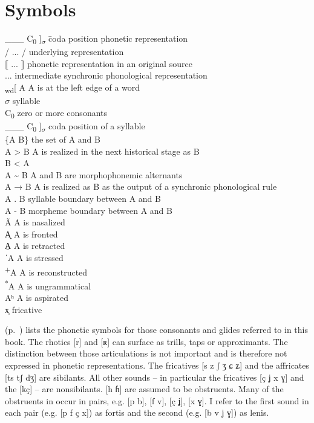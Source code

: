 \section*{Symbols}
\begin{tabbing}
\_\_\_ C\textsubscript{0} ]\textsubscript{${\sigma}$} \= coda position\kill
\relax [ ... ]  \>   phonetic representation\\
/ ... /  \>  underlying  representation\\
⟦ ... ⟧  \>  phonetic representation  in an original source\\
{\textbar} ... {\textbar}  \>  intermediate synchronic phonological representation\\
\textsubscript{wd}[ A   \>    A is at the left edge of a   word\\
${\sigma}$  \>  syllable\\
C\textsubscript{0}  \>  zero or more consonants\\
\_\_\_ C\textsubscript{0} ]\textsubscript{${\sigma}$}  \>  coda position of a syllable\\
\{A B\}  \>  the set of A and B\\
A > B  \>  A is realized in the next historical stage as B\\
B < A  \>  \\
A {\textasciitilde} B  \>  A and B are   morphophonemic alternants\\
A → B   \>  A is realized as B as the  output of a synchronic  phonological rule\\
 A . B  \>  syllable boundary between A and B\\
 A - B  \>  morpheme boundary between A and B\\
\~{A}  \>  A is nasalized\\
A̟  \>  A is fronted\\
A̠  \>  A is retracted\\
ˈA  \>  A is stressed\\
\textsuperscript{+}A  \>  A is reconstructed\\
\textsuperscript{*}A  \>  A is ungrammatical\\
Aʰ   \> A is aspirated\\
x̟   \>  fricative\\
\end{tabbing}


 (p.~\pageref{tab:abbv:1}) lists the phonetic symbols for those consonants and glides referred to in this book. The rhotics [r] and [ʀ] can surface as trills, taps or approximants. The distinction between those articulations is not important and is therefore not expressed in phonetic representations. The fricatives [s z ʃ ʒ ɕ ʑ] and the affricates [ts tʃ dʒ] are sibilants. All other sounds -- in particular the fricatives [ç ʝ x ɣ] and the  [kç] -- are nonsibilants. [h ɦ] are assumed to be obstruents. Many of the obstruents in  occur in pairs, e.g. [p b], [f v], [ç ʝ], [x ɣ]. I refer to the first sound in each pair (e.g. [p f ç x]) as fortis and the second (e.g. [b v ʝ ɣ]) as lenis.

